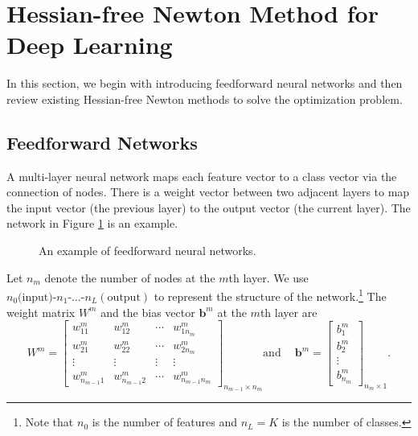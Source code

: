 \documentclass[12pt]{article}
\def\bb{{\boldsymbol b}}
\renewcommand{\baselinestretch}{2}
\begin{document}
\section{Hessian-free Newton Method for Deep Learning}
\label{sec:Hessian-free-Deep}
In this section, we begin with introducing feedforward neural networks and then review existing Hessian-free Newton methods to solve the optimization problem.
\subsection{Feedforward Networks}
\label{subsec:Feedforward}
A multi-layer neural network maps each feature vector to a class vector via the connection of nodes. There is
a weight vector between two adjacent layers to map the input vector (the previous layer) to the output vector (the current layer).
The network in Figure \ref{fig:nnexample} is an example.
\begin{figure}[t]
\begin{center}

\caption{An example of feedforward neural networks.\protect\footnotemark}
\label{fig:nnexample}
\end{center}
\end{figure}
Let $n_m$ denote the number of nodes at the $m$th layer. We use $n_0 \text{(input)-}n_1\text{-}\ldots\text{-}n_L(\text{output})$
to represent the structure of the network.\footnote{Note that $n_0$ is the number of features and
$n_L = K$ is the number of classes.\label{n_0}}
The weight matrix $W^m$ and the bias vector $\bb^m$ at the $m$th layer are
\begin{equation*}
W^{m} =
\begin{bmatrix}
w^m_{11}& w^m_{12}& \cdots & w^m_{1n_{m}}\\
w^m_{21}& w^m_{22}& \cdots & w^m_{2n_{m}}\\
\vdots& \vdots& \vdots & \vdots\\
w^m_{n_{m-1}1}& w^m_{n_{m-1}2}& \cdots & w^m_{n_{m-1}n_{m}}
\end{bmatrix}_{n_{m-1} \times n_{m}} \text{and}\quad \  
\bb^m = \begin{bmatrix}
b^m_1\\
b^m_2\\
\vdots\\
b^m_{n_m}
\end{bmatrix}_{n_m \times 1}.
\label{w-and-bias}
\end{equation*}
\end{document}
